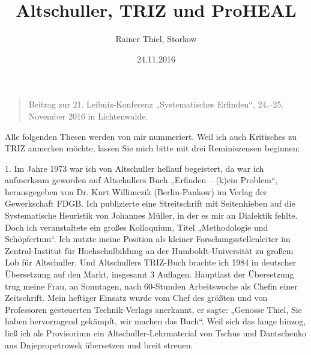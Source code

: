\documentclass[12pt,a4paper]{article}
\title{Altschuller, TRIZ und ProHEAL}
\author{Rainer Thiel, Storkow}
\date{24.11.2016}
\begin{document}
\maketitle
\begin{quote}
  Beitrag zur 21. Leibniz-Konferenz „Systematisches Erfinden“,
  24.--25. November 2016 in Lichtenwalde.
\end{quote}

Alle folgenden Thesen werden von mir nummeriert. Weil ich auch Kritisches zu
TRIZ anmerken möchte, lassen Sie mich bitte mit drei Reminiszensen beginnen:

1. Im Jahre 1973 war ich von Altschuller hellauf begeistert, da war ich
aufmerksam geworden auf Altschullers Buch „Erfinden – (k)ein Problem“,
herausgegeben von Dr. Kurt Willimczik (Berlin-Pankow) im Verlag der
Gewerkschaft FDGB. Ich publizierte eine Streitschrift mit Seitenhieben auf die
Systematische Heuristik von Johannes Müller, in der es mir an Dialektik
fehlte. Doch ich veranstaltete ein großes Kolloquium, Titel „Methodologie und
Schöpfertum“. Ich nutzte meine Position als kleiner Forschungsstellenleiter im
Zentral-Institut für Hochschulbildung an der Humboldt-Universität zu großem
Lob für Altschuller.  Und Altschullers TRIZ-Buch brachte ich 1984 in deutscher
Übersetzung auf den Markt, insgesamt 3 Auflagen. Hauptlast der Übersetzung
trug meine Frau, an Sonntagen, nach 60-Stunden Arbeitswoche als Chefin einer
Zeitschrift. Mein heftiger Einsatz wurde vom Chef des größten und von
Professoren gesteuerten Technik-Verlags anerkannt, er sagte: „Genosse Thiel,
Sie haben hervorragend gekämpft, wir machen das Buch“. Weil sich das lange
hinzog, ließ ich als Provisorium ein Altschuller-Lehrmaterial von Tschus und
Dantschenko aus Dnjepropetrowsk übersetzen und breit streuen.
\end{document}
